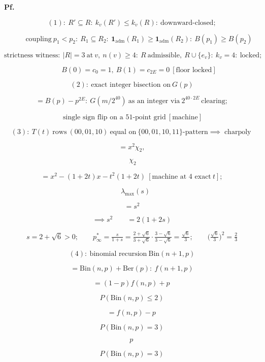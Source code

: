 \begin{theorem}
\textbf{Pf.}

\[
(1):\ R'\subseteq R:\ k_v(R')\le k_v(R):\ \text{downward-closed};
\]

\[
\qquad \text{coupling}\ p_1<p_2:\ R_1\subseteq R_2:\ \mathbf 1_{\mathrm{adm}}(R_1)\ge\mathbf 1_{\mathrm{adm}}(R_2):\ B(p_1)\ge B(p_2)
\]

\[
\text{strictness witness}:\ |R|=3\ \text{at}\ v,\ n(v)\ge4:\ R\ \text{admissible},\ R\cup\{e_v\}:\ k_v=4:\ \text{locked};
\]

\[
\qquad B(0)=c_0=1,\ B(1)=c_{2E}=0\ [\text{floor locked}]
\]

\[
(2):\ \text{exact integer bisection on}\ G(p)
\]

\[
= B(p)-p^{2E}:\ G(m/2^{40})\ \text{as an integer via}\ 2^{40\cdot 2E}\ \text{clearing};
\]

\[
\ \text{single sign flip on a 51-point grid}\ [\text{machine}]
\]

\[
(3):\ T(t)\ \text{rows}\ (00,01,10)\ \text{equal on}\ \{00,01,10,11\}\text{-pattern}\implies\operatorname{charpoly}
\]

\[
= x^2\chi_2,
\]

\[
\ \chi_2
\]

\[
= x^2-(1{+}2t)x-t^2(1{+}2t)\ [\text{machine at 4 exact}\ t];
\]

\[
\quad\lambda_{\max}(s)
\]

\[
= s^2
\]

\[
\implies s^2\qquad = 2(1{+}2s)
\]

\[
s=2+\sqrt6>0;\qquad p^*_\infty=\tfrac s{1+s}=\tfrac{2+\sqrt6}{3+\sqrt6}\cdot\tfrac{3-\sqrt6}{3-\sqrt6}=\tfrac{\sqrt6}3;\qquad\bigl(\tfrac{\sqrt6}3\bigr)^2=\tfrac23
\]

\[
(4):\ \text{binomial recursion}\ \mathrm{Bin}(n{+}1,p)
\]

\[
= \mathrm{Bin}(n,p)+\mathrm{Ber}(p):\ f(n{+}1,p)
\]

\[
= (1-p)f(n,p)+p\,
\]

\[
P(\mathrm{Bin}(n,p)\le2)
\]

\[
= f(n,p)-p\,
\]

\[
P(\mathrm{Bin}(n,p)=3)
\]

\[
p\,
\]

\[
P(\mathrm{Bin}(n,p){=}3)
\]


\end{theorem}

